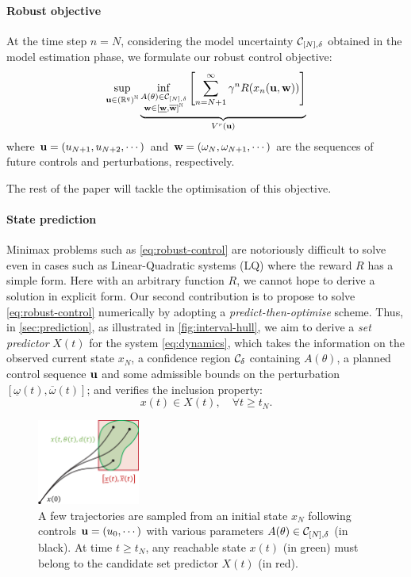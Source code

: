 \documentclass{article}
\begin{document}
\paragraph{Robust objective}

At the time step $n=N$, considering the model uncertainty $\mathcal{C}_{[N],\delta}$ obtained in the model estimation phase, we formulate our robust control objective:
\begin{equation}
\label{eq:robust-control}
\sup_{\mathbf{u}\in{(\mathbb{R}^q)}^{\mathbb{N}}} \underbrace{\inf_{\substack{A(\theta) \in \mathcal{C}_{[N],\delta} \\ \mathbf{w}\in[\underline{\mathbf{w}},\overline{\mathbf{w}}]^{\mathbb{N}}}} \left[\sum_{n=N+1}^\infty \gamma^n R(x_n(\mathbf{u},\mathbf{w}))\right]}_{V^r(\mathbf{u})}
\end{equation}
where $\mathbf{u} = (u_{N+1},u_{N+2},\cdots)$ and $\mathbf{w} = (\omega_N, \omega_{N+1},\cdots)$ are the sequences of future controls and perturbations, respectively.

The rest of the paper will tackle the optimisation of this objective.

\paragraph{State prediction}

Minimax problems such as \eqref{eq:robust-control} are notoriously difficult to solve even in cases such as Linear-Quadratic systems (LQ) where the reward $R$ has a simple form. Here with an arbitrary function $R$, we cannot hope to derive a solution in explicit form. Our second contribution is to propose to solve \eqref{eq:robust-control} numerically by adopting a \emph{predict-then-optimise} scheme. Thus, in \autoref{sec:prediction}, as illustrated in \autoref{fig:interval-hull}, we aim to derive a \emph{set predictor} $X(t)$ for the system \eqref{eq:dynamics}, which takes the information on the observed current state ${x}_N$, a confidence region $\mathcal{C}_\delta$ containing $A(\theta)$, a planned control sequence $\mathbf{u}$ and some admissible bounds on the perturbation $[\underline{\omega}(t),\overline{\omega}(t)]$; and verifies the inclusion property:
\begin{equation}
 x(t)\in X(t),\quad\forall t\geq t_N.
\end{equation}

\begin{figure}
    \centering
    \includegraphics[width=0.3\textwidth]{img/interval-hull}
    \caption{A few trajectories are sampled from an initial state $x_N$ following controls $\mathbf{u}=(u_0,\cdots)$ with various parameters $A(\theta)\in\mathcal{C}_{[N],\delta}$ (in black). At time $t\geq t_N$, any reachable state $x(t)$ (in green) must belong to the candidate set predictor $X(t)$ (in red).}
    \label{fig:interval-hull}
\end{figure}
\end{document}
